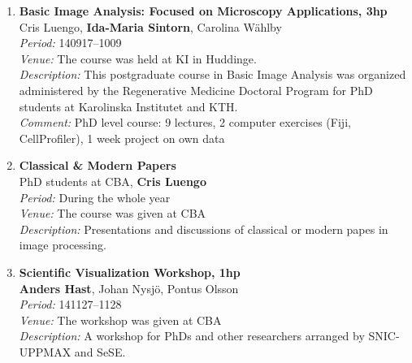 {\begin{enumerate}
\item
{\bf Basic Image Analysis: Focused on Microscopy Applications, 3hp}~\\
Cris Luengo, {\bf Ida-Maria Sintorn}, Carolina W\"{a}hlby~\\
{\em Period:} 140917--1009\\
{\em Venue:} The course was held at KI in Huddinge.~\\
{\em Description:} This postgraduate course in Basic Image Analysis was organized administered by the Regenerative Medicine Doctoral Program for PhD students at Karolinska Institutet and KTH.\\
{\em Comment:} PhD level course: 9 lectures, 2 computer exercises (Fiji, CellProfiler), 1 week project on own data

\item
{\bf Classical \& Modern Papers}~\\
PhD students at CBA, {\bf Cris Luengo}~\\
{\em Period:} During the whole year\\
{\em Venue:} The course was given at CBA\\
{\em Description:} Presentations and discussions of classical or modern papes in image processing.~

\item
{\bf Scientific Visualization Workshop, 1hp}~\\
{\bf Anders Hast}, Johan Nysj\"{o}, Pontus Olsson~\\
{\em Period:} 141127--1128\\
{\em Venue:} The workshop was given at CBA\\
{\em Description:} A workshop for PhDs and other researchers arranged by SNIC-UPPMAX and SeSE.
%



\end{enumerate}
}


\newpage
